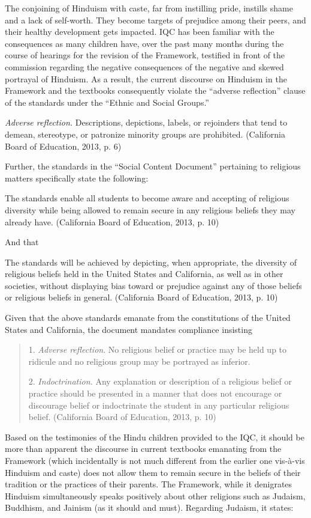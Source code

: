 The conjoining of Hinduism with caste, far from instilling pride, instills shame and a lack of self-worth. They become targets of prejudice among their peers, and their healthy development gets impacted. IQC has been familiar with the consequences as many children have, over the past many months during the course of hearings for the revision of the Framework, testified in front of the commission regarding the negative consequences of the negative and skewed portrayal of Hinduism. As a result, the current discourse on Hinduism in the Framework and the textbooks consequently violate the “adverse reflection” clause of the standards under the “Ethnic and Social Groups.” 

\textit{Adverse reflection.} Descriptions, depictions, labels, or rejoinders that tend to demean, stereotype, or patronize minority groups are prohibited. (California Board of Education, 2013, p. 6)

Further, the standards in the “Social Content Document” pertaining to religious matters specifically state the following:

The standards enable all students to become aware and accepting of religious diversity while being allowed to remain secure in any religious beliefs they may already have. (California Board of Education, 2013, p. 10)

And that

The standards will be achieved by depicting, when appropriate, the diversity of religious beliefs held in the United States and California, as well as in other societies, without displaying bias toward or prejudice against any of those beliefs or religious beliefs in general. (California Board of Education, 2013, p. 10)

Given that the above standards emanate from the constitutions of the United States and California, the document mandates compliance insisting

\begin{quote}
1. \textit{Adverse reflection}. No religious belief or practice may be held up to ridicule and no religious group may be portrayed as inferior.

2. \textit{Indoctrination.} Any explanation or description of a religious belief or practice should be presented in a manner that does not encourage or discourage belief or indoctrinate the student in any particular religious belief. (California Board of Education, 2013, p. 10)
\end{quote}

Based on the testimonies of the Hindu children provided to the IQC, it should be more than apparent the discourse in current textbooks emanating from the Framework (which incidentally is not much different from the earlier one vis-à-vis Hinduism and caste) does not allow them to remain secure in the beliefs of their tradition or the practices of their parents. The Framework, while it denigrates Hinduism simultaneously speaks positively about other religions such as Judaism, Buddhism, and Jainism (as it should and must). Regarding Judaism, it states:

